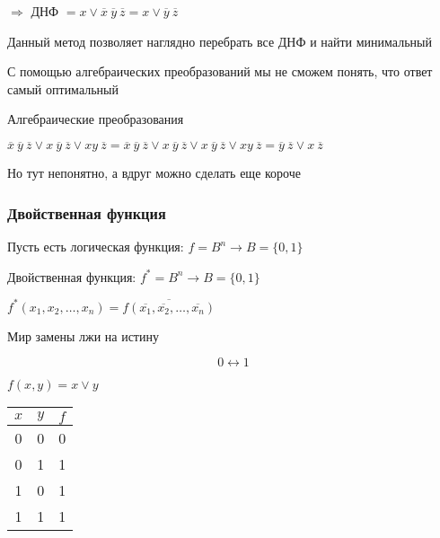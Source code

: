 \documentclass[russian]{lecture-notes}
\begin{document}
\begin{sloppypar}
\begin{example}

	$\Rightarrow $ ДНФ $ = x \lor \overline{x} \: \overline{y} \: \overline{z} = x \lor \overline{y} \: \overline{z}$

\end{example}

\begin{remark}
	Данный метод позволяет наглядно перебрать все ДНФ и найти минимальный
	
	С помощью алгебраических преобразований мы не сможем понять, что ответ самый оптимальный
\end{remark}

\begin{example}
	Алгебраические преобразования
	
	$\overline{x} \: \overline{y} \: \overline{z} \lor x \: \overline{y} \: \overline{z} \lor xy \: \overline{z} = \overline{x} \: \overline{y} \: \overline{z} \lor x \: \overline{y} \: \overline{z} \lor x \: \overline{y} \: \overline{z} \lor xy \: \overline{z} = \overline{y} \: \overline{z} \lor x \: \overline{z}$
	
	Но тут непонятно, а вдруг можно сделать еще короче
\end{example}

\subsubsection{Двойственная функция}

	Пусть есть логическая функция: $f = B^n \rightarrow B = \{0, 1\}$
	
	Двойственная функция: $f^* = B^n \rightarrow B = \{0, 1\}$
	
	$f^*(x_1, x_2, \dots, x_n) = \overline{f(\overline{x_1}, \overline{x_2}, \dots, \overline{x_n})}$

\begin{remark}
	Мир замены лжи на истину
	
	$$0 \leftrightarrow 1$$
\end{remark}

\begin{example}
	$f(x, y) = x \lor y$
	
	\begin{table}[h!]
		\centering
		\begin{tabular}{|c|c|c|}
			\hline
			$x$ & $y$ & $f$ \\ \hline
			0 & 0 & 0 \\ \hline
			0 & 1 & 1 \\ \hline
			1 & 0 & 1 \\ \hline
			1 & 1 & 1 \\ \hline
		\end{tabular}
	\end{table}
	

\end{example}
\end{sloppypar}
\end{document}
